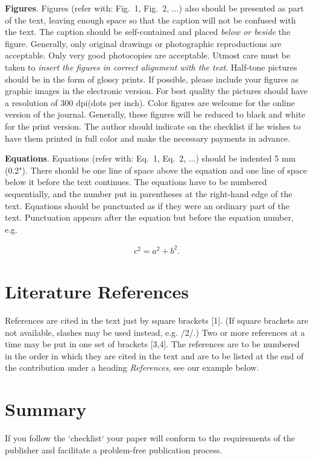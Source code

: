 \documentclass{ttp}
\begin{document}
\textbf{Figures}. Figures (refer with: Fig.~1, Fig.~2, ...) also should be presented as part of the text, leaving enough space so that the
caption will not be confused with the text. The caption should be self-contained and placed \textit{below or beside }the
figure. Generally, only original drawings or photographic reproductions are acceptable. Only very good photocopies are
acceptable. Utmost care must be taken to \textit{insert the figures in correct alignment with the text}. Half-tone pictures
 should be in the form of glossy prints. If possible, please include your figures as graphic images in the electronic version.
For best quality the pictures should have a resolution of 300 dpi(dots per inch).
\noindent Color figures are welcome for the online version of the journal. Generally, these figures will be reduced to black
and white for the print version. The author should indicate on the checklist if he wishes to have them printed in full color
and make the necessary payments in advance.

\vspace{6pt}
\textbf{Equations}.  Equations (refer with: Eq.~1, Eq.~2, ...) should be indented 5 mm (0.2").
There should be one line of space above the equation and one line of space below it before the text continues.
The equations have to be numbered sequentially, and the number put in parentheses at the right-hand edge of the
text. Equations should be punctuated as if they were an ordinary part of the text. Punctuation appears after the
equation but before the equation number, e.g.

\begin{eqnarray}
c^2 = a^2 + b^2.
\end{eqnarray}

\section{Literature References}

\noindent References are cited in the text just by square brackets [1].
 (If square brackets are not available, slashes may be used instead, e.g. /2/.)
Two or more references at a time may be put in one set of brackets [3,4]. The
references are to be numbered in the order in which they are cited in the text and
are to be listed at the end of the contribution under a heading \textit{References},
see our example below.

\section{Summary}
\noindent If you follow the `checklist` your paper will conform to the requirements
 of the publisher and facilitate a problem-free publication process.
\end{document}
